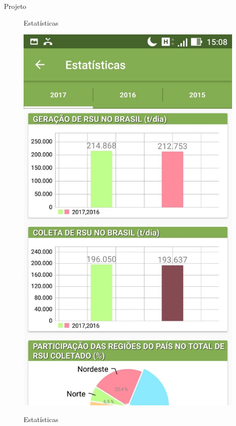 \documentclass[
	12pt,				%
	openright,			%
	twoside,			%
	a4paper,			%
	english,			%
	french,				%
	spanish,			%
	brazil				%
	]{abntex2}
\begin{document}
\begin{chapter}{Projeto}
    \begin{figure}[htb]    
 \centering
  \begin{minipage}{0.45\textwidth}
    \centering
    \caption{Estatísticas}
    \includegraphics[scale=0.35]{media/tela_stats_1.jpg}
     \label{fig:tela_stats_1}
  \end{minipage}
  \hfill
  \begin{minipage}{0.45\textwidth}
    \centering
    \caption{Estatísticas}

\end{minipage}
\end{figure}
\end{chapter}
\end{document}
